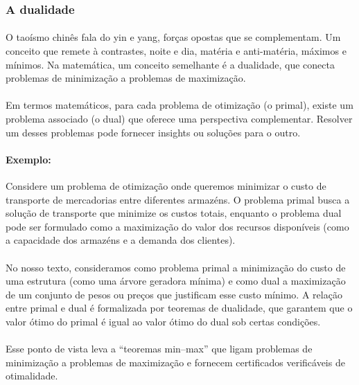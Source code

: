 \documentclass[12pt,a4paper]{article}
\def\emph#1{#1}%
\begin{document}
\subsubsection{A dualidade}

\paragraph{}
O taoísmo chinês fala do yin e yang, forças opostas que se complementam. Um conceito que remete à contrastes, noite e dia, matéria e anti-matéria, máximos e mínimos. Na matemática, um conceito semelhante é a \emph{dualidade}, que conecta problemas de minimização a problemas de maximização.

\paragraph{}
Em termos matemáticos, para cada problema de otimização (o \emph{primal}), existe um problema associado (o \emph{dual}) que oferece uma perspectiva complementar. Resolver um desses problemas pode fornecer insights ou soluções para o outro.

\paragraph{Exemplo:}
Considere um problema de otimização onde queremos minimizar o custo de transporte de mercadorias entre diferentes armazéns. O problema primal busca a solução de transporte que minimize os custos totais, enquanto o problema dual pode ser formulado como a maximização do valor dos recursos disponíveis (como a capacidade dos armazéns e a demanda dos clientes).

\paragraph{}
No nosso texto, consideramos como problema primal a minimização do custo de uma estrutura (como uma árvore geradora mínima) e como dual a maximização de um conjunto de pesos ou preços que justificam esse custo mínimo. A relação entre primal e dual é formalizada por teoremas de dualidade, que garantem que o valor ótimo do primal é igual ao valor ótimo do dual sob certas condições.

\paragraph{}
Esse ponto de vista leva a “teoremas min–max” que ligam problemas de \emph{minimização} a problemas de \emph{maximização} e fornecem certificados verificáveis de otimalidade.
\end{document}
